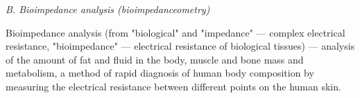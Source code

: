 \documentclass[twocolumn]{scndocument}
\begin{document}
\begin{flushleft}
\vspace{-3pt}
\textit{B. Bioimpedance analysis (bioimpedanceometry)}
\vspace{-3pt}
\end{flushleft}

Bioimpedance analysis (from "biological" and 
"impedance" — complex electrical resistance,
"bioimpedance" — electrical resistance of biological
tissues) — analysis of the amount of fat and fluid in
the body, muscle and bone mass and metabolism, a
method of rapid diagnosis of human body composition
by measuring the electrical resistance between different
points on the human skin.

 
\end{document}
